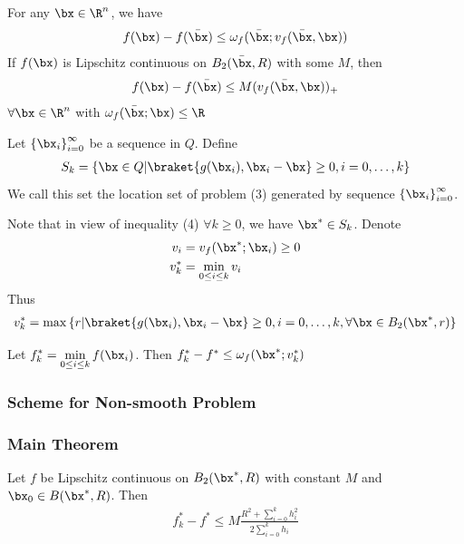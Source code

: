 \begin{lemma}
    For any $\bx\in\R^n$, we have
    \begin{align*}
        f(\bx)-f(\bar{\bx})\le \omega_f(\bar{\bx};v_f(\bar{\bx},\bx))
    \end{align*}
    If $f(\bx)$ is Lipschitz continuous on $B_2(\bar{\bx}, R)$ with some $M$, then
    \begin{align*}
        f(\bx)-f(\bar{\bx})\le M(v_f(\bar{\bx}, \bx))_+
    \end{align*}
    $\forall \bx\in\R^n$ with $\omega_f(\bar{\bx}; \bx)\le \R$
\end{lemma}

\begin{definition}
    Let $\left\{ \bx_i \right\}_{i=0}^\infty$ be a sequence in $Q$. Define
    \begin{align*}
        S_k=\left\{ \bx\in Q|\braket{g(\bx_i), \bx_i-\bx}\ge 0,i=0,\dots,k \right\}
    \end{align*}
    We call this set the location set of problem (3) generated by sequence $\left\{ \bx_i \right\}_{i=0}^\infty$.  
\end{definition}
Note that in view of inequality (4) $\forall k\ge 0$, we have $\bx^*\in S_k$. Denote
\begin{align*}
    v_i&=v_f(\bx^*;\bx_i)\ge 0\\
    v_k^*&=\min_{0\le i\le k}v_i
\end{align*}
Thus
\begin{align*}
    v_k^*=\max\left\{ r|\braket{g(\bx_i), \bx_i-\bx}\ge0,i=0,\dots,k,\forall \bx\in B_2(\bx^*,r ) \right\}
\end{align*}

\begin{lemma}
    Let $\displaystyle f_k^*=\min_{0\le i\le k}f(\bx_i)$. Then $f_k^*-f^*\le \omega_f(\bx^*;v_k^*)$
\end{lemma}

\subsubsection{Scheme for Non-smooth Problem}


\subsubsection{Main Theorem}
\begin{theorem}
    Let $f$ be Lipschitz continuous on $B_2(\bx^*, R)$ with constant $M$ and $\bx_0\in B(\bx^*, R)$. Then
    \begin{align*}
        f_k^*-f^*\le M\frac{R^2+\sum_{i=0}^kh_i^2}{2\sum_{i=0}^kh_i}
    \end{align*}
\end{theorem}


